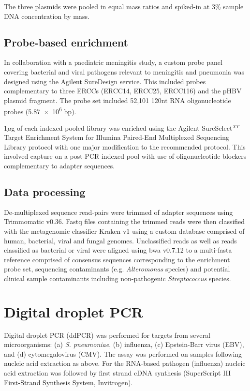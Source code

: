 The three plasmids were pooled in equal mass ratios and spiked-in at 3\% sample DNA concentration by mass.

\subsection{Probe-based enrichment}
In collaboration with a paediatric meningitis study, a custom probe panel covering bacterial and viral pathogens relevant to meningitis and pneumonia was designed using the Agilent SureDesign service. This included probes complementary to three ERCCs (ERCC14, ERCC25, ERCC116) and the pHBV plasmid fragment. The probe set included 52,101 120nt RNA oligonucleotide probes (\num{5.87e6} bp). 

1$\mu$g of each indexed pooled library was enriched using the Agilent SureSelect$^{XT}$ Target Enrichment System for Illumina Paired-End Multiplexed Sequencing Library protocol with one major modification to the recommended protocol. This involved capture on a post-PCR indexed pool with use of oligonucleotide blockers complementary to adapter sequences.

\subsection{Data processing}
De-multiplexed sequence read-pairs were trimmed of adapter sequences using Trimmomatic v0.36. Fastq files containing the trimmed reads were then classified with the metagenomic classifier Kraken v1 using a custom database comprised of human, bacterial, viral and fungal genomes. Unclassified reads as well as reads classified as bacterial or viral were aligned using bwa v0.7.12 to a multi-fasta reference comprised of consensus sequences corresponding to the enrichment probe set, sequencing contaminants (e.g. \textit{Alteromonas} species) and potential clinical sample contaminants including non-pathogenic \textit{Streptococcus} species.


\section{Digital droplet PCR}
Digital droplet PCR (ddPCR) was performed for targets from several microorganisms: (a) \textit{S. pneumoniae}, (b) influenza,  (c) Epstein-Barr virus (EBV), and (d) cytomegalovirus (CMV). The assay was performed on samples following nucleic acid extraction as above. For the RNA-based pathogen (influenza) nucleic acid extraction was followed by first strand cDNA synthesis (SuperScript III First-Strand Synthesis System, Invitrogen). 

